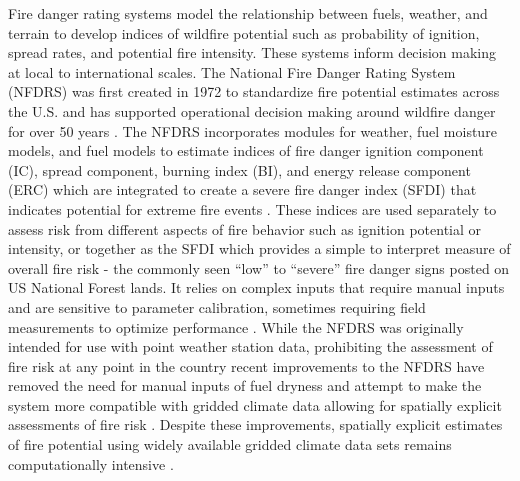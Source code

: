 \documentclass[11p]{article}
\begin{document}
Fire danger rating systems model the relationship between fuels, weather, and terrain to develop indices of wildfire potential such as probability of ignition, spread rates, and potential fire intensity. These systems inform decision making at local to international scales. The National Fire Danger Rating System (NFDRS) was first created in 1972 to standardize fire potential estimates across the U.S. and has supported operational decision making around wildfire danger for over 50 years \citep{jollyModernizingUSNational2024,zacharakisEnvironmentalForestFire2023}. The NFDRS incorporates modules for weather, fuel moisture models, and fuel models to estimate indices of fire danger ignition component (IC), spread component, burning index (BI), and energy release component (ERC) which are integrated to create a severe fire danger index (SFDI) that indicates potential for extreme fire events \citep{jollyModernizingUSNational2024,jollySevereFireDanger2019}. These indices are used separately to assess risk from different aspects of fire behavior such as ignition potential or intensity, or together as the SFDI which provides a simple to interpret measure of overall fire risk - the commonly seen ``low'' to ``severe'' fire danger signs posted on US National Forest lands. It relies on complex inputs that require manual inputs and are sensitive to parameter calibration, sometimes requiring field measurements to optimize performance \citep{jollyModernizingUSNational2024}. While the NFDRS was originally intended for use with point weather station data, prohibiting the assessment of fire risk at any point in the country recent improvements to the NFDRS have removed the need for manual inputs of fuel dryness and attempt to make the system more compatible with gridded climate data allowing for spatially explicit assessments of fire risk \citep{jollyModernizingUSNational2024}. Despite these improvements, spatially explicit estimates of fire potential using widely available gridded climate data sets remains computationally intensive \citep{farguellFastSpatialNFDRS2025a}.

\end{document}
